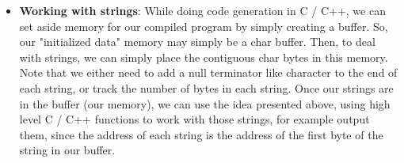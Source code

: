 \documentclass{report}
\begin{document}
\begin{itemize}
\begin{enumerate}
                    \bigbreak \noindent 
                    \begin{cppcode}
                        int x;
                        x = "hello";
                    \end{cppcode}
                    \bigbreak \noindent 
                    This could be syntactically valid but semantically incorrect.
                \item \textbf{Type inference and annotation}: The analyzer often annotates the AST with type information.
                \item \textbf{Scope and Visibility Rules}: Semantic analysis enforces rules such as:
                    \begin{itemize}
                        \item variable scope
                        \item shadowing
                        \item function visibility
                        \item block scope
                    \end{itemize}
                \item \textbf{Additional Language Constraints}: Things like
                    \begin{itemize}
                        \item correct number of function arguments
                        \item return statements matching function type
                        \item break/continue only inside loops
                        \item duplicate declarations
                    \end{itemize}
            \end{enumerate}
            Context free grammars cannot enforce such constraints.
        \item \textbf{Working with strings}: While doing code generation in C / C++, we can set aside memory for our compiled program by simply creating a buffer. So, our "initialized data" memory may simply be a char buffer. Then, to deal with strings, we can simply place the contiguous char bytes in this memory.
            \bigbreak \noindent 
            Note that we either need to add a null terminator like character to the end of each string, or track the number of bytes in each string.
            \bigbreak \noindent 
            Once our strings are in the buffer (our memory), we can use the idea presented above, using high level C / C++ functions to work with those strings, for example output them, since the address of each string is the address of the first byte of the string in our buffer.

\end{itemize}
\end{document}

